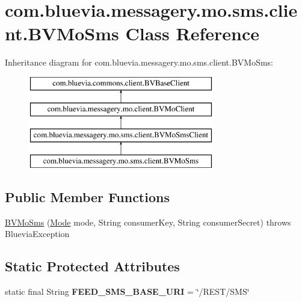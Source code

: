 \hypertarget{classcom_1_1bluevia_1_1messagery_1_1mo_1_1sms_1_1client_1_1BVMoSms}{
\section{com.bluevia.messagery.mo.sms.client.BVMoSms Class Reference}
\label{classcom_1_1bluevia_1_1messagery_1_1mo_1_1sms_1_1client_1_1BVMoSms}
}
Inheritance diagram for com.bluevia.messagery.mo.sms.client.BVMoSms:\begin{figure}[H]
\begin{center}
\leavevmode
\includegraphics[height=4.000000cm]{classcom_1_1bluevia_1_1messagery_1_1mo_1_1sms_1_1client_1_1BVMoSms}
\end{center}
\end{figure}
\subsection*{Public Member Functions}
\begin{DoxyCompactItemize}
\item 
\hyperlink{classcom_1_1bluevia_1_1messagery_1_1mo_1_1sms_1_1client_1_1BVMoSms_a2d40c46a5c363f49a9b4bdc2e9d4f5e2}{BVMoSms} (\hyperlink{classcom_1_1bluevia_1_1commons_1_1client_1_1BVBaseClient_a5f4a4a27d73a8ddd0ce450a6c7a4d1b7}{Mode} mode, String consumerKey, String consumerSecret)  throws BlueviaException
\end{DoxyCompactItemize}
\subsection*{Static Protected Attributes}
\begin{DoxyCompactItemize}
\item 
\hypertarget{classcom_1_1bluevia_1_1messagery_1_1mo_1_1sms_1_1client_1_1BVMoSms_acd0b857a64b3045e7e3ea6984d803d24}{
static final String {\bfseries FEED\_\-SMS\_\-BASE\_\-URI} = \char`\"{}/REST/SMS\char`\"{}}
\label{classcom_1_1bluevia_1_1messagery_1_1mo_1_1sms_1_1client_1_1BVMoSms_acd0b857a64b3045e7e3ea6984d803d24}

\end{DoxyCompactItemize}



